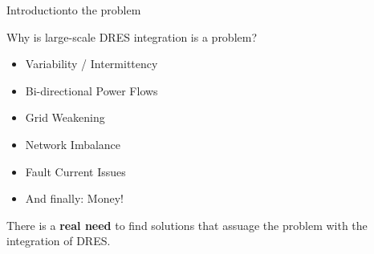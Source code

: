 \documentclass[xcolor=svgnames,aspectratio=32,8pt]{beamer}
\begin{document}

\begin{frame}
  {Introduction}{to the problem}

  Why is large-scale DRES integration is a problem?

  \begin{itemize}
    \item Variability / Intermittency
    \item Bi-directional Power Flows
    \item Grid Weakening
    \item Network Imbalance
    \item Fault Current Issues
    \item And finally: Money!
  \end{itemize}

  \vspace{0.4cm}
  There is a \textbf{real need} to find solutions that assuage the problem with the integration of DRES.

\end{frame}

\end{document}
